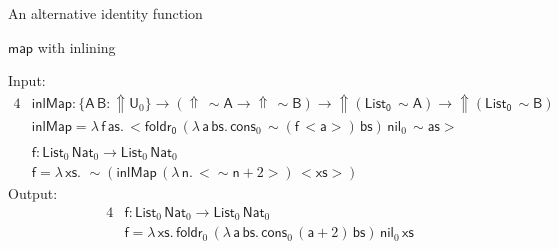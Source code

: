 \documentclass[dvipsnames,aspectratio=169]{beamer}
\newcommand{\msf}[1]{\mathsf{#1}}
\newcommand{\Lift}{{\Uparrow}}
\newcommand{\spl}{{\sim}}
\newcommand{\qut}[1]{{<}#1{>}}
\newcommand{\U}{\msf{U}}
\newcommand{\Bool}{\msf{Bool}}
\newcommand{\List}{\msf{List}}
\newcommand{\nil}{\msf{nil}}
\newcommand{\cons}{\msf{cons}}
\newcommand{\Nat}{\msf{Nat}}
\newcommand{\id}{\msf{id}}
\theoremstyle{remark}
\newcommand{\msA}{\msf{A}}
\newcommand{\msB}{\msf{B}}
\newcommand{\msx}{\msf{x}}
\newcommand{\msas}{\msf{as}}
\newcommand{\msbs}{\msf{bs}}
\newcommand{\msxs}{\msf{xs}}
\newcommand{\msff}{\msf{f}}
\newcommand{\msa}{\msf{a}}
\begin{document}
\begin{frame}{An alternative identity function}


\end{frame}


\begin{frame}{$\msf{map}$ with inlining}

Input:
\begin{alignat*}{4}
  & \msf{inlMap} : \{\msA\,\msB : \Lift \U_0\} \to (\Lift\,\spl\msA \to \Lift\,\spl\msB) \to \Lift(\msf{List_0}\,\spl\msA) \to \Lift(\msf{List_0}\,\spl\msB) \\
  & \msf{inlMap} = \lambda\,\msff\,\msas.\,\qut{\msf{foldr_0}\,
    (\lambda\,\msa\,\msbs.\,\cons_0\,\spl(\msff\,\qut{\msa})\,\msbs)\,
    \nil_0\,
    \spl{\msas}
    }\\
  & \\
  & \msf{f} : \List_0\,\Nat_0 \to \List_0\,\Nat_0\\
  & \msf{f} = \lambda\,\msxs.\,\,\spl(\msf{inlMap}\,(\lambda\,\msf{n}.\,\qut{\spl\msf{n} + 2})
     \,\qut{\msxs})
\end{alignat*}
\pause
Output:
\begin{alignat*}{4}
  & \msf{f} : \List_0\,\Nat_0 \to \List_0\,\Nat_0\\
  & \msf{f} = \lambda\,\msxs.\, \msf{foldr}_0\,(\lambda\,\msa\,\msbs.\,\cons_0\,(\msa + 2)\,\msbs)\,\nil_0\,\msxs
\end{alignat*}

\end{frame}
\end{document}

